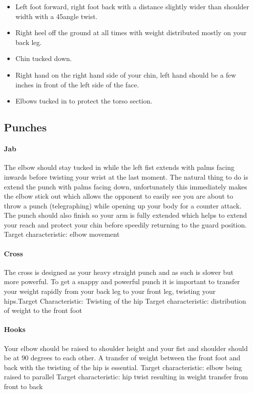 \begin{itemize}
  \item Left foot forward, right foot back with a distance slightly wider than shoulder width with a 45\degree angle twist.
  \item Right heel off the ground at all times with weight distributed mostly on your back leg.
  \item Chin tucked down.
  \item Right hand on the right hand side of your chin, left hand should be a few inches in front of the left side of the face.
  \item Elbows tucked in to protect the torso section.
\end{itemize}

\subsection{Punches}
\label{subsec:subsec03}
\paragraph{Jab}
The elbow should stay tucked in while the left fist extends with palms facing inwards before twisting your wrist at the last moment. The natural thing to do is extend the punch with palms facing down, unfortunately this immediately makes the elbow stick out which allows the opponent to easily see you are about to throw a punch (telegraphing) while opening up your body for a counter attack. The punch should also finish so your arm is fully extended which helps to extend your reach and protect your chin before speedily returning to the guard position.\newline
Target characteristic: elbow movement

\paragraph{Cross}
The cross is designed as your heavy straight punch and as such is slower but more powerful. To get a snappy and powerful punch it is important to transfer your weight rapidly from your back leg to your front leg, twisting your hips.\newline Target Characteristic: Twisting of the hip\newline
Target characteristic: distribution of weight to the front foot


\paragraph{Hooks}
Your elbow should be raised to shoulder height and your fist and shoulder should be at 90 degrees to each other. A transfer of weight between the front foot and back with the twisting of the hip is essential.\newline
Target characteristic: elbow being raised to parallel\newline
Target characteristic: hip twist resulting in weight transfer from front to back\newline

